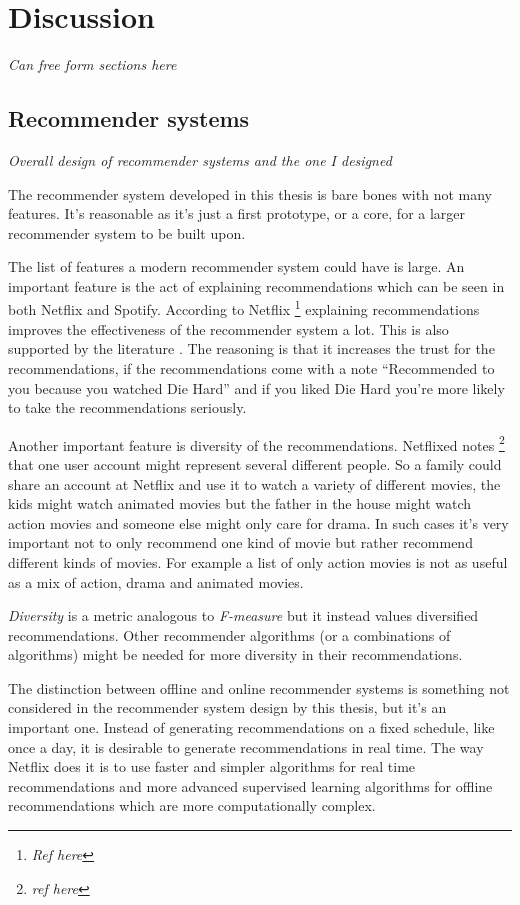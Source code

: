 \chapter{Discussion}\label{cha:discussion}

\textit{Can free form sections here}

\section{Recommender systems}
\textit{Overall design of recommender systems and the one I designed}

The recommender system developed in this thesis is bare bones with not many features. It's reasonable as it's just a first prototype, or a core, for a larger recommender system to be built upon.

The list of features a modern recommender system could have is large. An important feature is the act of explaining recommendations which can be seen in both Netflix and Spotify. According to Netflix
\footnote{\textit{Ref here}}
explaining recommendations improves the effectiveness of the recommender system a lot. This is also supported by the literature
. The reasoning is that it increases the trust for the recommendations, if the recommendations come with a note ``Recommended to you because you watched Die Hard'' and if you liked Die Hard you're more likely to take the recommendations seriously.

Another important feature is diversity of the recommendations. Netflixed notes
\footnote{\textit{ref here}}
that one user account might represent several different people. So a family could share an account at Netflix and use it to watch a variety of different movies, the kids might watch animated movies but the father in the house might watch action movies and someone else might only care for drama. In such cases it's very important not to only recommend one kind of movie but rather recommend different kinds of movies. For example a list of only action movies is not as useful as a mix of action, drama and animated movies.

\textit{Diversity}
is a metric analogous to \textit{F-measure} but it instead values diversified recommendations. Other recommender algorithms (or a combinations of algorithms) might be needed for more diversity in their recommendations.

The distinction between offline and online recommender systems is something not considered in the recommender system design by this thesis, but it's an important one. Instead of generating recommendations on a fixed schedule, like once a day, it is desirable to generate recommendations in real time. The way Netflix does it is to use faster and simpler algorithms for real time recommendations and more advanced supervised learning algorithms for offline recommendations which are more computationally complex.


